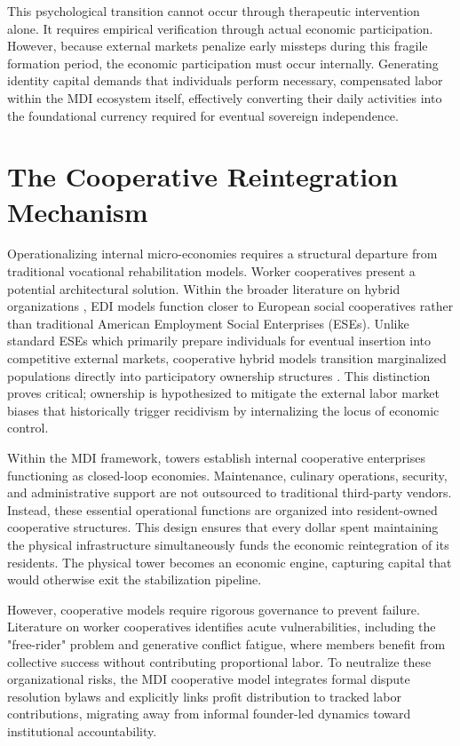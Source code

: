 \documentclass[12pt, letterpaper]{article}
\begin{document}
This psychological transition cannot occur through therapeutic intervention alone. It requires empirical verification through actual economic participation. However, because external markets penalize early missteps during this fragile formation period, the economic participation must occur internally. Generating identity capital demands that individuals perform necessary, compensated labor within the MDI ecosystem itself, effectively converting their daily activities into the foundational currency required for eventual sovereign independence.

\section{The Cooperative Reintegration Mechanism}

Operationalizing internal micro-economies requires a structural departure from traditional vocational rehabilitation models. Worker cooperatives present a potential architectural solution. Within the broader literature on hybrid organizations \cite{battilana2014advancing}, EDI models function closer to European social cooperatives \cite{defourny2010conceptions, galera2009social} rather than traditional American Employment Social Enterprises (ESEs). Unlike standard ESEs which primarily prepare individuals for eventual insertion into competitive external markets, cooperative hybrid models transition marginalized populations directly into participatory ownership structures \cite{perotin2014what}. This distinction proves critical; ownership is hypothesized to mitigate the external labor market biases that historically trigger recidivism by internalizing the locus of economic control.

Within the MDI framework, towers establish internal cooperative enterprises functioning as closed-loop economies. Maintenance, culinary operations, security, and administrative support are not outsourced to traditional third-party vendors. Instead, these essential operational functions are organized into resident-owned cooperative structures. This design ensures that every dollar spent maintaining the physical infrastructure simultaneously funds the economic reintegration of its residents. The physical tower becomes an economic engine, capturing capital that would otherwise exit the stabilization pipeline.

However, cooperative models require rigorous governance to prevent failure. Literature on worker cooperatives identifies acute vulnerabilities, including the "free-rider" problem and generative conflict fatigue, where members benefit from collective success without contributing proportional labor. To neutralize these organizational risks, the MDI cooperative model integrates formal dispute resolution bylaws and explicitly links profit distribution to tracked labor contributions, migrating away from informal founder-led dynamics toward institutional accountability.
\end{document}

